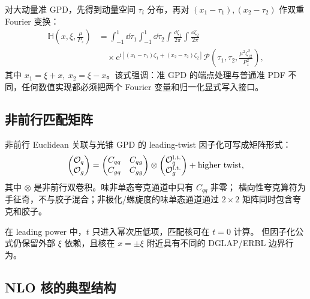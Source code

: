 \documentclass[12pt,a4paper]{ctexart}
\theoremstyle{definition}
\newcommand{\ii}{\mathrm{i}}
\newcommand{\ee}{\mathrm{e}}
\begin{document}
对大动量准 GPD，先得到动量空间 $\tau_i$ 分布，再对
$(x_1-\tau_1),(x_2-\tau_2)$ 作双重 Fourier 变换：
\begin{equation}
\begin{aligned}
\mathbb H\!\left(x,\xi,\frac{\mu}{P_z}\right)
&=\int_{-1}^{1}\dd\tau_1\int_{-1}^{1}\dd\tau_2
\int\frac{\dd\zeta_1}{2\pi}\int\frac{\dd\zeta_2}{2\pi}\\
&\quad\times
\ee^{\ii[(x_1-\tau_1)\zeta_1+(x_2-\tau_2)\zeta_2]}
\mathcal P\!\left(\tau_1,\tau_2,\frac{\mu^2\zeta_{12}^2}{P_z^2}\right),
\end{aligned}
\label{eq:quasi-gpd-double-ft}
\end{equation}
其中 $x_1=\xi+x,\ x_2=\xi-x$。该式强调：准 GPD 的端点处理与普通准 PDF
不同，任何数值实现都必须把两个 Fourier 变量和归一化显式写入接口。

\subsection{非前行匹配矩阵}

非前行 Euclidean 关联与光锥 GPD 的 leading-twist 因子化可写成矩阵形式：
\begin{equation}
\begin{pmatrix}
\mathcal O_q\\
\mathcal O_g
\end{pmatrix}
=
\begin{pmatrix}
C_{qq} & C_{qg}\\
C_{gq} & C_{gg}
\end{pmatrix}
\otimes
\begin{pmatrix}
\mathcal O_q^{\rm l.t.}\\
\mathcal O_g^{\rm l.t.}
\end{pmatrix}
+\text{higher twist},
\label{eq:nonforward-matching-matrix}
\end{equation}
其中 $\otimes$ 是非前行双卷积。味非单态夸克通道中只有 $C_{qq}$ 非零；
横向性夸克算符为手征奇，不与胶子混合；非极化/螺旋度的味单态通道通过
$2\times2$ 矩阵同时包含夸克和胶子。

在 leading power 中，$t$ 只进入幂次压低项，匹配核可在 $t=0$ 计算。
但因子化公式仍保留外部 $\xi$ 依赖，且核在 $x=\pm\xi$ 附近具有不同的
DGLAP/ERBL 边界行为。

\subsection{NLO 核的典型结构}
\end{document}

